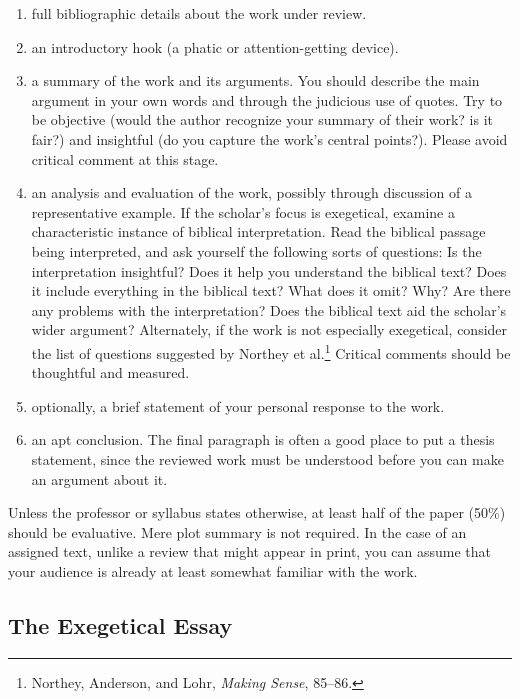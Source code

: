 \documentclass[11pt]{article}
\begin{document}
\begin{enumerate}

\item full bibliographic details about the work under review.

\item an introductory hook (a phatic or attention-getting device).

\item a summary of the work and its arguments. You should describe the
main argument in your own words and through the judicious use of quotes.
Try to be objective (would the author recognize your summary of their
work? is it fair?) and insightful (do you capture the work's central
points?). Please avoid critical comment at this stage.

\item an analysis and evaluation of the work, possibly through
discussion of a representative example. If the scholar's focus is
exegetical, examine a characteristic instance of biblical
interpretation. Read the biblical passage being interpreted, and ask
yourself the following sorts of questions: Is the interpretation
insightful? Does it help you understand the biblical text? Does it
include everything in the biblical text? What does it omit? Why? Are
there any problems with the interpretation? Does the biblical text aid
the scholar’s wider argument? Alternately, if the work is not especially
exegetical, consider the list of questions suggested by Northey et
al.\footnote{Northey, Anderson, and Lohr, \emph{Making Sense}, 85–86.}
Critical comments should be thoughtful and measured.

\item optionally, a brief statement of your personal response to the
work.

\item an apt conclusion. The final paragraph is often a good place to
put a thesis statement, since the reviewed work must be understood
before you can make an argument about it.

\end{enumerate}

Unless the professor or syllabus states otherwise, at least half of the
paper (50\%) should be evaluative. Mere plot summary is not required. In
the case of an assigned text, unlike a review that might appear in
print, you can assume that your audience is already at least somewhat
familiar with the work.

\subsection{The Exegetical Essay}
\end{document}

